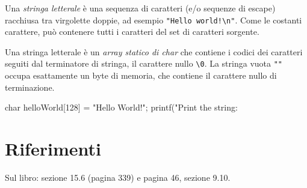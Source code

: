 \documentclass[11pt,a4paper]{article}
\begin{document}
Una \emph{stringa letterale} è una sequenza di caratteri (e/o sequenze di escape) racchiusa tra virgolette doppie, ad esempio \lstinline|"Hello world!\n"|. Come le costanti carattere, può contenere tutti i caratteri del set di caratteri sorgente.

Una stringa letterale è un \emph{array statico di char} che contiene i codici dei caratteri seguiti dal terminatore di stringa, il carattere nullo \lstinline|\0|. La stringa vuota \lstinline|""| occupa esattamente un byte di memoria, che contiene il carattere nullo di terminazione.

\begin{codice}
char helloWorld[128] = "Hello World!\n";
printf("Print the string: %
\end{codice}

\section*{Riferimenti}

Sul libro: sezione 15.6 (pagina 339) e pagina 46, sezione 9.10.
\end{document}
